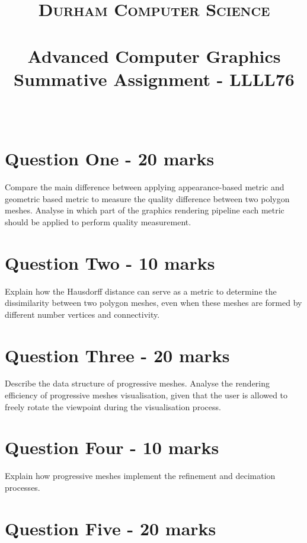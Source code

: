 \documentclass[paper=a4, fontsize=11pt]{scrartcl}
\date{}
\title{
		\vspace{-1in} 	
		\usefont{OT1}{bch}{b}{n}
		\normalfont \normalsize \textsc{Durham Computer Science} \\ [5pt]
		\horrule{0.5pt} \\[0.4cm]
		\huge  Advanced Computer Graphics Summative Assignment - LLLL76\\
		\horrule{2pt} \\[0.5cm]
		\vspace{-1in} 	
}
\numberwithin{equation}{section}		%
\numberwithin{figure}{section}			%
\numberwithin{table}{section}				%
\begin{document}
\maketitle

\section*{Question One - 20 marks}

Compare the main difference between applying appearance-based metric and geometric based
metric to measure the quality difference between two polygon meshes. Analyse in
which part of the graphics rendering pipeline each metric should be applied to perform quality
measurement. \\



\section*{Question Two - 10 marks}

Explain how the Hausdorff distance can serve as a metric to determine the dissimilarity
between two polygon meshes, even when these meshes are formed by different number
vertices and connectivity.\\



\section*{Question Three - 20 marks}

Describe the data structure of progressive meshes. Analyse the rendering efficiency of
progressive meshes visualisation, given that the user is allowed to freely rotate the viewpoint
during the visualisation process.\\



\section*{Question Four - 10 marks}

Explain how progressive meshes implement the refinement and decimation processes.\\



\section*{Question Five - 20 marks}
\end{document}
